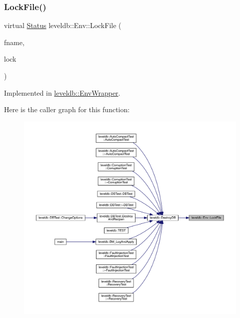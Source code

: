 \subsubsection{\texorpdfstring{LockFile()}{LockFile()}}
{\footnotesize\ttfamily virtual \mbox{\hyperlink{classleveldb_1_1_status}{Status}} leveldb\+::\+Env\+::\+Lock\+File (\begin{DoxyParamCaption}\item[{const std\+::string \&}]{fname,  }\item[{\mbox{\hyperlink{classleveldb_1_1_file_lock}{File\+Lock}} $\ast$$\ast$}]{lock }\end{DoxyParamCaption})\hspace{0.3cm}{\ttfamily [pure virtual]}}



Implemented in \mbox{\hyperlink{classleveldb_1_1_env_wrapper_a1f571f5f4eef62ee5437991aeba52b71}{leveldb\+::\+Env\+Wrapper}}.

Here is the caller graph for this function\+:
\nopagebreak
\begin{figure}[H]
\begin{center}
\leavevmode
\includegraphics[width=350pt]{classleveldb_1_1_env_a9b7266f0444f832e428328ff19b7b54c_icgraph}
\end{center}
\end{figure}
\mbox{\label{classleveldb_1_1_env_a77886b6f8f8b5df8e40057be234a3b5d}} 
